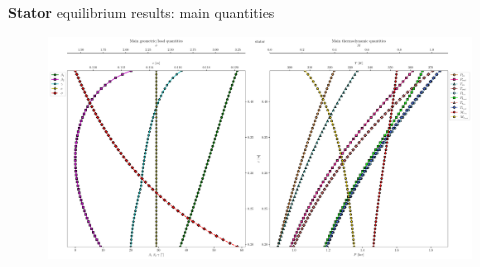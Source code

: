 	\begin{frame}{\textbf{Stator} equilibrium results: main quantities}
		\begin{figure}
			\centering
			\includegraphics[width=1\textwidth]{figures/statorBetaThermo.pdf}
		\end{figure}
	\end{frame}
	
